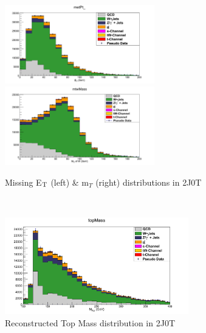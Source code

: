 \begin{figure}[hbpt]
\begin{center}
\caption{ Missing E$_{\rm{T}}$ (left) \& m$_{T}$ (right) distributions in 2J0T}
\includegraphics[width=6.5cm]{figures/2J0T/metPt_0To200.png}
\includegraphics[width=6.5cm]{figures/2J0T/MtW_0To200.png}\hfill 
\end{center}
\end{figure}
\\
\begin{figure}[hbpt]
\begin{center}
\caption{Reconstructed Top Mass distribution in 2J0T}
\includegraphics[width=8.0cm]{figures/2J0T/mtop.png}\hfill
\end{center}
\end{figure}
\newpage  
%
%
%
%
